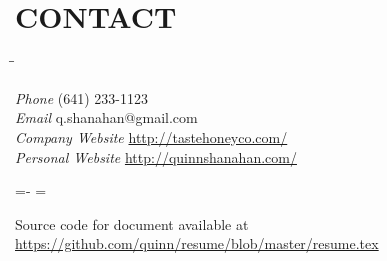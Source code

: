 \documentclass[line,margin]{res}
\begin{document}
\begin{resume}
\begin{samepage}
\begin{itemize}
    \end{itemize}
    \end{samepage}

\section{CONTACT}
    \vspace{-2.3ex}
    \begin{tabbing}
    \hspace{1.5in}\= \hspace{2.0in}\= \kill

    {\sl Phone}            \> (641) 233-1123 \\
    {\sl Email}            \> q.shanahan@gmail.com \\
    {\sl Company Website}  \> \url{http://tastehoneyco.com/} \\
    {\sl Personal Website} \> \url{http://quinnshanahan.com/} \\

    \end{tabbing}

\vfill
\leftskip=-\hoffset
\advance\textwidth\hoffset
\hsize=\textwidth
\fullline
\vskip 2pt

Source code for document available at
\url{https://github.com/quinn/resume/blob/master/resume.tex}

\end{resume}
\end{document}
